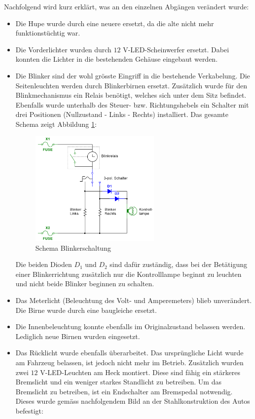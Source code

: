 Nachfolgend wird kurz erklärt, was an den einzelnen Abgängen verändert wurde:
\begin{itemize}
\item Die Hupe wurde durch eine neuere ersetzt, da die alte nicht mehr funktionstüchtig war.
\item Die Vorderlichter wurden durch $12$ V-LED-Scheinwerfer ersetzt. Dabei konnten die Lichter in die bestehenden Gehäuse eingebaut werden.
\item Die Blinker sind der wohl grösste Eingriff in die bestehende Verkabelung. Die Seitenleuchten werden durch Blinkerbirnen ersetzt. Zusätzlich wurde für den Blinkmechanismus ein Relais benötigt, welches sich unter dem Sitz befindet. Ebenfalls wurde unterhalb des Steuer- bzw. Richtungshebels ein Schalter mit drei Positionen (Nullzustand - Links - Rechts) installiert. Das gesamte Schema zeigt Abbildung \ref{fig:SchemaBlinkerschaltung}:

\begin{figure}[h]
	\centering
		\includegraphics[width=0.6\textwidth]{images/Blinkerschaltung_Schema}
	\caption{Schema Blinkerschaltung}
	\label{fig:SchemaBlinkerschaltung}
\end{figure}

Die beiden Dioden $D_1$ und $D_2$ sind dafür zuständig, dass bei der Betätigung einer Blinkerrichtung zusätzlich nur die Kontrolllampe beginnt zu leuchten und nicht beide Blinker beginnen zu schalten.
\item Das Meterlicht (Beleuchtung des Volt- und Amperemeters) blieb unverändert. Die Birne wurde durch eine baugleiche ersetzt.
\item Die Innenbeleuchtung konnte ebenfalls im Originalzustand belassen werden. Lediglich neue Birnen wurden eingesetzt.
\newpage
\item Das Rücklicht wurde ebenfalls überarbeitet. Das ursprüngliche Licht wurde am Fahrzeug belassen, ist jedoch nicht mehr im Betrieb. Zusätzlich wurden zwei $12$ V-LED-Leuchten am Heck montiert. Diese sind fähig ein stärkeres Bremslicht und ein weniger starkes Standlicht zu betreiben. Um das Bremslicht zu betreiben, ist ein Endschalter am Bremspedal notwendig. Dieses wurde gemäss nachfolgendem Bild an der Stahlkonstruktion des Autos befestigt:


\end{itemize}
